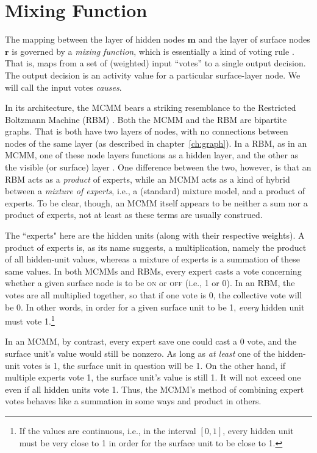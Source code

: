 \section{Mixing Function}
\label{sec:mixing-function}

The mapping between the layer of hidden nodes $\mathbf{m}$ 
and the layer of surface nodes $\mathbf{r}$ is governed by a 
\emph{mixing function}, which is essentially
a kind of voting rule \citep{saund:94}. That is, maps from a set of (weighted)
input ``votes'' to a single output decision.  The output decision is 
an activity value for a particular surface-layer node. We will call the input votes
\emph{causes}. 

In its architecture, the \ac{MCMM} bears a striking resemblance to the 
Restricted Boltzmann Machine (RBM) \citep{smolensky:1986}.
Both the \ac{MCMM} and the \ac{RBM} are bipartite graphs. 
That is both have two layers of nodes, with no connections between nodes of the 
same layer (as described in chapter~\ref{ch:graph}).  In a RBM, as in an \ac{MCMM}, 
one of these node layers functions as a hidden layer, and the other as the visible 
(or surface) layer \citep[see, e.g.,][]{mohamed-and-hinton:2010}. One difference between 
the two, however, is that an RBM acts as a \emph{product} of experts, while an \ac{MCMM} 
acts as a kind of hybrid between a \emph{mixture of experts}, i.e., a (standard) mixture model, 
and a product of experts. To be clear, though, an \ac{MCMM} itself appears to be neither
 a sum nor a product of experts, not at least as these terms are usually construed. 

The ``experts" here 
are the hidden units (along with their
respective weights). A product of experts is, as its name suggests, a multiplication, 
namely the product of all hidden-unit values, whereas a mixture of experts is a 
summation of these same values. In both MCMMs and RBMs, every expert casts 
a vote concerning whether a given surface node is to be \textsc{on} or \textsc{off} 
(i.e., 1 or 0). In an RBM, the votes are all multiplied together, so that if one vote is 0, 
the collective vote will be 0. In other words, in order for a given surface unit to be 1, 
\emph{every} hidden unit must vote 1.\footnote{If the values are continuous, i.e., in 
the interval $[0,1]$, every hidden unit must be very close to 1 in order for the surface 
unit to be close to 1.}

In an MCMM, by contrast, every expert save one could cast a 0 vote, and the surface 
unit's value would still be nonzero. As long as \emph{at least} one of the hidden-unit 
votes is 1, the surface unit in question will be 1. On the other hand, if multiple experts 
vote 1, the surface unit's value is still 1. It will not exceed one even if all hidden units 
vote 1. Thus, the \ac{MCMM}'s method of combining expert votes behaves like a 
summation in some ways and product in others.  

